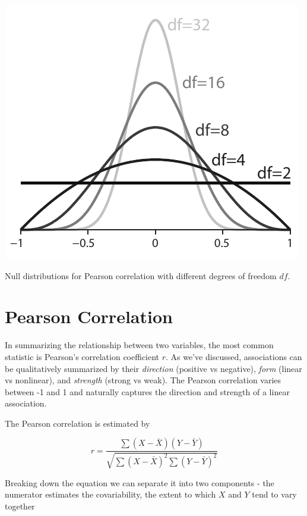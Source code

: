 \documentclass{tufte-handout}
\begin{document}
\begin{marginfigure}[20pt]
  \includegraphics[width=\linewidth]{handout8_rpdf}%
  \label{fig:fullfig}%
\caption{Null distributions for Pearson correlation with different degrees of freedom $df$.}
\end{marginfigure}

\section{Pearson Correlation}

In summarizing the relationship between two variables, the most common statistic is Pearson's correlation coefficient $r$. As we've discussed, associations can be qualitatively summarized by their \emph{direction} (positive vs negative), \emph{form} (linear vs nonlinear), and \emph{strength} (strong vs weak). The Pearson correlation varies between -1 and 1 and naturally captures the direction and strength of a linear association.

The Pearson correlation is estimated by

\begin{equation*}
r = \frac{\sum (X-\bar{X})(Y-\bar{Y})}{\sqrt{\sum (X-\bar{X})^2 \sum (Y-\bar{Y})^2}}
\end{equation*}

Breaking down the equation we can separate it into two components - the numerator estimates the covariability, the extent to which $X$ and $Y$ tend to vary together
\end{document}
